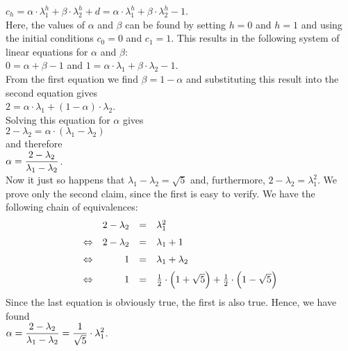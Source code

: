 $c_h = \alpha \cdot \lambda_1^h + \beta \cdot \lambda_2^h + d =\alpha \cdot \lambda_1^h + \beta \cdot \lambda_2^h - 1$.
\\[0.2cm]
Here, the values of $\alpha$ and $\beta$ can be found by setting $h=0$ and $h=1$ and using the
initial conditions $c_0 = 0$ and $c_1 = 1$.  This results in
the following system of linear equations for  $\alpha$ and $\beta$:
\\[0.2cm]
\hspace*{1.3cm}
$0 = \alpha + \beta - 1$ \quad and \quad
$1 = \alpha \cdot \lambda_1 + \beta \cdot \lambda_2 - 1$.
\\[0.2cm]
From the first equation we find $\beta = 1-\alpha$ and substituting this result into the second equation
gives
\\[0.2cm]
\hspace*{1.3cm}
$2 = \alpha \cdot \lambda_1 + (1-\alpha) \cdot \lambda_2$.
\\[0.2cm]
Solving this equation for $\alpha$ gives
\\[0.2cm]
\hspace*{1.3cm}
$2 - \lambda_2 = \alpha \cdot (\lambda_1 - \lambda_2)$
\\[0.2cm]
and therefore
\\[0.2cm]
\hspace*{1.3cm}
$\displaystyle \alpha = \frac{2 - \lambda_2}{\lambda_1 - \lambda_2}$.
\\[0.2cm]
Now it just so happens that $\lambda_1 - \lambda_2 = \sqrt{5}$ and, furthermore, $2 - \lambda_2 = \lambda_1^2$.
We prove only the second claim, since the first is easy to verify.  We have the following
chain of equivalences:
$$
\begin{array}{crcl}
                  & 2 - \lambda_2 & = & \lambda_1^2            \\[0.2cm]
  \Leftrightarrow & 2 - \lambda_2 & = & \lambda_1 + 1          \\[0.2cm]
  \Leftrightarrow & 1             & = & \lambda_1 + \lambda_2  \\[0.2cm]
  \Leftrightarrow & 1             & = &\frac{1}{2} \cdot \Bigl(1 + \sqrt{5}\Bigr) + \frac{1}{2} \cdot \Bigl(1 - \sqrt{5}\Bigr) 
\end{array}
$$
Since the last equation is obviously true, the first is also true.
Hence, we have found
\\[0.2cm]
\hspace*{1.3cm}
$\displaystyle \alpha = \frac{2 - \lambda_2}{\lambda_1 - \lambda_2} = \frac{1}{\sqrt{5}} \cdot \lambda_1^2$.
\\[0.2cm]
